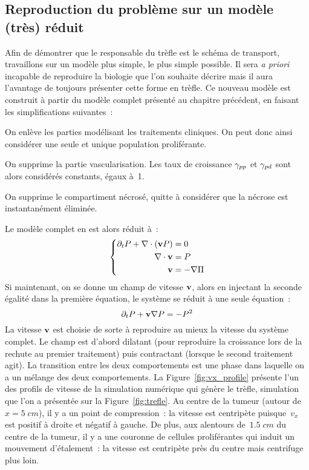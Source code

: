 \documentclass[main.tex]{subfiles}
\begin{document}
\subsection{Reproduction du problème sur un modèle (très) réduit}
Afin de démontrer que le responsable du trèfle est le schéma de transport, travaillons sur un modèle plus simple, le plus simple possible. Il sera \textit{a priori} incapable de reproduire la biologie que l'on souhaite décrire mais il aura l'avantage de toujours présenter cette forme en trèfle. 
Ce nouveau modèle est construit à partir du modèle complet présenté au chapitre précédent, en faisant les simplifications suivantes~:
\begin{myitemize}
\item On enlève les parties modélisant les traitements cliniques. On peut donc ainsi considérer une seule et unique population proliférante.
\item On supprime la partie vascularisation. Les taux de croissance $\gamma_{pp}$ et $\gamma_{pd}$ sont alors considérés constants, égaux à~1.
\item On supprime le compartiment nécrosé, quitte à considérer que la nécrose  est instantanément éliminée.
\end{myitemize}
Le modèle complet en est alors réduit à~:
\begin{equation}
\left\{ \begin{aligned}
\partial_t P + \nabla\cdot (\mathbf{v} P) &= 0 \\
\nabla\cdot \mathbf{v} &= P  \\
\mathbf{v} &= -\nabla \Pi
\end{aligned} \right.
\end{equation}
Si maintenant, on se donne un champ de vitesse $\mathbf{v}$, alors en injectant la seconde égalité dans la première équation, le système se réduit à une seule équation~:
\begin{equation}\label{eq:mod_reduit_test_transp}
\partial_t P + \mathbf{v} \nabla P = -P^2
\end{equation}
La vitesse $\mathbf{v}$ est choisie de sorte à reproduire au mieux la vitesse du système complet. Le champ est d'abord dilatant (pour reproduire la croissance lors de la rechute au premier traitement) puis contractant (lorsque le second traitement agit). La transition entre les deux comportements est une phase dans laquelle on a un mélange des deux comportements. 
La Figure~\ref{fig:vx_profile} présente l'un des profils de vitesse de la simulation numérique qui génère le trèfle, simulation que l'on a présentée sur la Figure~\ref{fig:trefle}. 
Au centre de la tumeur (autour de~$x=5\;cm$), il y a un point de compression~: 
la vitesse est centripète puisque~$v_x$ est positif à droite et négatif à gauche. 
De plus, aux alentours de~$1.5\;cm$ du centre de la tumeur, il y a une couronne de cellules proliférantes qui induit un mouvement d'étalement~: la vitesse est centripète près du centre mais centrifuge plus loin. 
\end{document}
